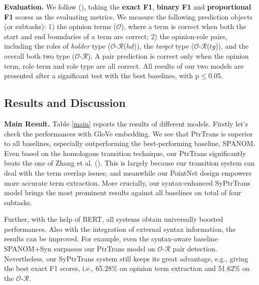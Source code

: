 \documentclass[letterpaper]{article} \usepackage{aaai22}  \usepackage{times}  \usepackage{helvet}  \usepackage{courier}  \usepackage[hyphens]{url}  \usepackage{graphicx} \urlstyle{rm} \def\UrlFont{\rm}  \usepackage{natbib}  \usepackage{caption} \DeclareCaptionStyle{ruled}{labelfont=normalfont,labelsep=colon,strut=off} \frenchspacing  \setlength{\pdfpagewidth}{8.5in}  \setlength{\pdfpageheight}{11in}  \usepackage{algorithm}
\begin{document}
\noindent\textbf{Evaluation.}
We follow \citeauthor{xia-etal-2021-unified}(\citeyear{xia-etal-2021-unified}), taking the \textbf{exact F1}, \textbf{binary F1} and \textbf{proportional F1} scores as the evaluating metrics.
We measure the following prediction objects (or subtasks):
1) the opinion terms ($\mathcal{O}$), where a term is correct when both the start and end boundaries of a term are correct;
2) the opinion-role pairs, including the roles of \emph{holder} type ($\mathcal{O}$-$\mathcal{R}$($hd$)), the \emph{target} type ($\mathcal{O}$-$\mathcal{R}$($tg$)), and the overall both two type ($\mathcal{O}$-$\mathcal{R}$).
A pair prediction is correct only when the opinion term, role term and
role type are all correct.
All results of our two models are presented after a significant test with the best baselines, with p$\le$0.05.










\subsection{Results and Discussion}



\noindent\textbf{Main Result.}
Table \ref{main} reports the results of different models.
Firstly let's check the performances with GloVe embedding.
We see that PtrTrans is superior to all baselines, especially outperforming the best-performing baseline, {S{\small PAN}OM}.
Even based on the homologous transition technique, our PtrTrans significantly beats the one of Zhang et al. (\citeyear{ZhangWF19}).
This is largely because our transition system can deal with the term overlap issues; and meanwhile our PointNet design empowers more accurate term extraction.
More crucially, our syntax-enhanced SyPtrTrans model brings the most prominent results against all baselines on total of four subtasks.


Further, with the help of BERT, all systems obtain universally boosted performances.
Also with the integration of external syntax information, the results can be improved.
For example, even the syntax-aware baseline S{\small PAN}OM+Syn surpasses our PtrTrans model on $\mathcal{O}$-$\mathcal{R}$ pair detection.
Nevertheless, our SyPtrTrans system still keeps its great advantage, e.g., giving the best exact F1 scores, i.e., 65.28\% on opinion term extraction and 51.62\% on the $\mathcal{O}$-$\mathcal{R}$.
\end{document}
